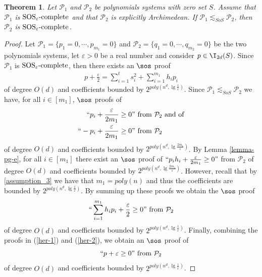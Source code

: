 \documentclass[11pt]{article}
\newtheorem{theorem}{Theorem}[section]
\newcommand{\SOSe}{\rm{SOS}_\varepsilon\text{-complete}}
\begin{document}
\begin{theorem}\label{th:richness_inheritance}
    Let $\mathcal{P}_1$ and $\mathcal{P}_2$ be polynomials systems with zero set $S$. Assume that $\mathcal P_1$ is $\SOSe$ and that $\mathcal{P}_2$ is explicitly Archimedean. If  $\mathcal{P}_1\lesssim_{SoS} \mathcal{P}_2$, then $\mathcal{P}_2$ is $\SOSe$. 
\end{theorem}
\begin{proof}
Let $\mathcal{P}_1=\{p_1 =0, \cdots, p_{m_1}=0\}$ and $\mathcal{P}_2=\{q_1=0, \cdots, q_{m_2}=0\}$ be the two polynomials systems, let $\varepsilon>0$ be a real number and consider $p\in \I_{2d}(S)$. Since $\mathcal{P}_1$ is $\SOSe$, then there exists an $\sos$ proof 
\begin{align}\label{her-1}
    p+\frac{\varepsilon}{2} = \sum_{i=1}^{t} s_i^2 + \sum_{i=1}^{m_1}h_ip_i
\end{align}
of degree $O(d)$ and coefficients bounded by $2^{poly(n^d, \lg \frac{1}{\varepsilon})}$.
Since $\mathcal{P}_1\lesssim_{SoS} \mathcal{P}_2$ we have, for all $i\in [m_1]$, $\sos$ proofs of
\begin{align*}
``p_i+\frac{\varepsilon}{2m_1} \geq 0&" \text{ from } \mathcal{P}_2 \text{ and of} \\
``-p_i+\frac{\varepsilon}{2m_1} \geq 0&" \text{ from } \mathcal{P}_2
\end{align*}
of degree $O(d)$ and coefficients bounded by $2^{poly(n^d, \lg \frac{2m_1}{\varepsilon})}$. By Lemma \ref{lemma-pg-e}, for all $i\in [m_1]$ there exist an $\sos$ proof of $``p_ih_i + \frac{\varepsilon}{2m_1}\geq 0"$ from $\mathcal{P}_2$ of degree $O(d)$ and coefficients bounded by $2^{poly(n^d, \lg\frac{2m_1}{\varepsilon})}$. However, recall that by \ref{assumption_3} we have that $m_1 = poly(n)$ and thus the coefficients are bounded by $2^{poly(n^d, \lg \frac{1}{\varepsilon})}$. By summing up these proofs we obtain the $\sos$ proof
\begin{align}\label{her-2}
    ``\sum_{i=1}^{m_1}h_ip_i + \frac{\varepsilon}{2} \geq 0" \text{ from } \mathcal{P}_2
\end{align}
of degree $O(d)$ and coefficients bounded by $2^{poly(n^d, \lg\frac{1}{\varepsilon})}$. Finally, combining the proofs in (\ref{her-1}) and (\ref{her-2}), we obtain an $\sos$ proof of 
$$``p+\varepsilon \geq 0" \text{ from } \mathcal{P}_2$$
of degree $O(d)$ and coefficients bounded by $2^{poly(n^d, \lg\frac{1}{\varepsilon})}$.
\end{proof}
\end{document}
